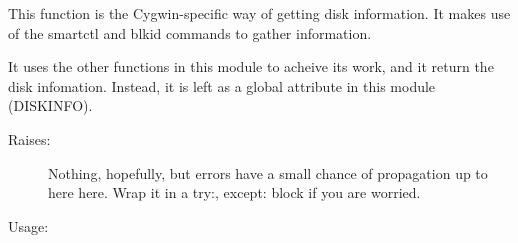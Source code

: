 \documentclass[letterpaper,10pt,english]{sphinxmanual}
\begin{document}
\begin{fulllineitems}
\label{\detokenize{cygwin:getdevinfo.cygwin.get_info}}
This function is the Cygwin-specific way of getting disk information.
It makes use of the smartctl and blkid commands to gather
information.

It uses the other functions in this module to acheive its work, and
it  return the disk infomation. Instead, it is left as a
global attribute in this module (DISKINFO).
\begin{description}
\item[{Raises:}] \leavevmode
Nothing, hopefully, but errors have a small chance of propagation
up to here here. Wrap it in a try:, except: block if you are worried.

\end{description}

Usage:

\begin{sphinxVerbatim}[commandchars=\\\{\}]
\end{sphinxVerbatim}

\end{fulllineitems}

\end{document}
